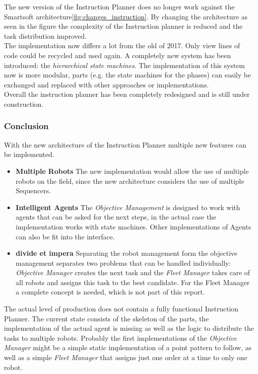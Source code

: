 The new version of the Instruction Planner does no longer work against the Smartsoft architecture\ref{fig:changes_instruction}.
By changing the architecture as seen in the figure the complexity of the Instruction planner is reduced and the task distribution improved.\\

The implementation now differs a lot from the old of 2017. Only view lines of code could be recycled and used again.
A completely new system has been introduced: the \textit{hierarchical state machines}. The implementation of
this system now is more modular, parts (e.g. the state machines for the phases) can easily be exchanged and
replaced with other approaches or implementations. \\
Overall the instruction planner has been completely redesigned and is still under construction.
\newpage

\subsubsection{Conclusion}
With the new architecture of the Instruction Planner multiple new features can be implemented.
\begin{itemize}
    \item \textbf{Multiple Robots} The new implementation would allow the use of multiple robots on the field, since
    the new architecture considers the use of multiple Sequencers.
    \item \textbf{Intelligent Agents} The \textit{Objective Management} is designed to work with agents that can be asked
    for the next steps, in the actual case the implementation works with state machines. Other implementations of Agents can
    also be fit into the interface.
    \item \textbf{divide et impera} Separating the robot management form the objective management separates two problems
    that can be handled individually: \textit{Objective Manager} creates the next task and the \textit{Fleet Manager} takes care
    of all robots and assigns this task to the best candidate. For the Fleet Manager a complete concept is needed, which is not part of this report.
\end{itemize}

The actual level of production does not contain a fully functional Instruction Planner.
The current state consists of the skeleton of the parts, the implementation of the
actual agent is missing as well as the logic to distribute the tasks to multiple robots.
Probably the first implementations of the \textit{Objective Manager} might be a
simple static implementation of a point pattern to follow, as well as a simple \textit{Fleet Manager} that
assigns just one order at a time to only one robot.

\newpage
